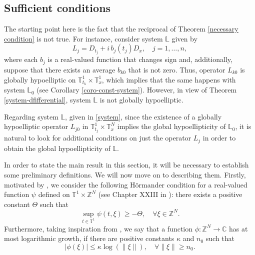 \documentclass[12pt]{elsarticle}
\numberwithin{equation}{section}
\begin{document}
\subsection{Sufficient conditions} \label{sec-suff-cond}


The starting point here is the fact that the reciprocal of Theorem \ref{necessary condition} is not true. For instance, consider  system $\mathbb{L}$ given by
$$
L_j = D_{t_j} + i \, b_j(t_j) D_x, \quad j=1,\ldots,n,
$$
where each $b_j$ is a real-valued function that changes sign and, additionally, suppose that there exists an average $b_{k0}$ that is not zero. Thus, operator $L_ {k0}$ is globally hypoelliptic on $\mathbb{T}_{t_k}^{1}\times \mathbb{T}_x^{1}$,  
which implies that the same happens with  system  
$\mathbb{L}_0$ (see Corollary \ref{coro-const-system}). However, in view of Theorem \ref{system-dfifferential},  system $\mathbb{L}$ is not globally hypoelliptic. 

Regarding  system $\mathbb{L}$, given in \eqref{system},  since  the existence of a globally hypoelliptic operator $L_ {j0}$  in $\mathbb{T}_{t_j}^{1}\times \mathbb{T}_x^{N}$ implies the global hypoellipticity of $\mathbb{L}_0$, it is natural to look for additional conditions on just the operator $L_j$ in order to obtain the global hypoellipticity of $\mathbb{L}$.

In order to state the main result in this section, it will be necessary to establish some preliminary definitions. We will now move on to describing them. Firstly, motivated by \cite{Avila}, we consider the following  H\"{o}rmander condition for a real-valued function $\psi$ defined on $\mathbb{T}^1\times\mathbb{Z}^N$ (see Chapter XXIII in \cite{Hormander3}): there exists a positive constant $\Theta$ such that
\begin{equation}\label{Hormander condition}
\sup_{t\in\mathbb{T}^1}\psi(t,\xi)\geqslant - \Theta,\quad  \forall \xi \in \mathbb{Z}^N.
\end{equation}
Furthermore, taking inspiration from \cite{AGKM}, we say that a  function $\phi:\mathbb{Z}^N\rightarrow \mathbb{C}$ has at most logarithmic growth,
if there are positive constants $\kappa$ and $n_0$ such that
\begin{equation}\label{log-estimate-1}
|\phi(\xi)| \leq  \kappa \log(\|\xi\|), \quad \forall \|\xi\|\geq  n_0.
\end{equation}
\end{document}
